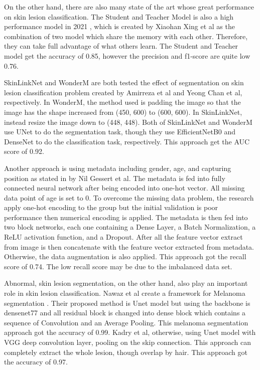 \documentclass[sensors,article,submit,pdftex,moreauthors]{Definitions/mdpi}
\begin{document}
{On the other hand, there are also many state of the art whose great performance on skin lesion classification. The Student and Teacher Model is also a high performance model in 2021 \mbox{\cite{03225}}, which is created by Xiaohan Xing et al as the combination of two model which share the memory with each other. Therefore, they can take full advantage of what others learn. The Student and Teacher model get the accuracy of 0.85, however the precision and f1-score are quite low 0.76. 

SkinLinkNet \mbox{\cite{12602}} and WonderM \mbox{\cite{03426}} are both tested the effect of segmentation on skin lesion classification problem created by Amirreza et al and Yeong Chan et al, respectively. In WonderM, the method used is padding the image so that the image has the shape increased from (450, 600) to (600, 600). In SkinLinkNet, instead resize the image down to (448, 448). Both of SkinLinkNet and WonderM use UNet to do the segmentation task, though they use EfficientNetB0 and DenseNet to do the classification task, respectively. This approach get the AUC score of 0.92.

Another approach is using metadata including gender, age, and capturing position as stated in \mbox{\cite{03910}} by Nil Gessert et al. The metadata is fed into fully connected neural network after being encoded into one-hot vector. All missing data point of age is set to 0. To overcome the missing data problem, the research apply one-hot encoding to the group but the initial validation is poor performance then numerical encoding is applied. The metadata is then fed into two block networks, each one containing a Dense Layer, a Batch Normalization, a ReLU activation function, and a Dropout. After all the feature vector extract from image is then concatenate with the feature vector extracted from metadata. Otherwise, the data augmentation is also applied. This approach got the recall score of 0.74. The low recall score may be due to the imbalanced data set.

Abnormal, skin lesion segmentation, on the other hand, also play an important role in skin lesion classification. Nawaz et al create a framework for Melanoma segmentation \mbox{\cite{22750}}. Their proposed method is Unet model but using the backbone is densenet77 and all residual block is changed into dense block which contains a sequence of Convolution and an Average Pooling. This melanoma segmentation approach got the accuracy of 0.99. Kadry et al, otherwise, using Unet model with VGG deep convolution layer, pooling on the skip connection. This approach can completely extract the whole lesion, though overlap by hair. This approach got the accuracy of 0.97.

}
\end{document}
